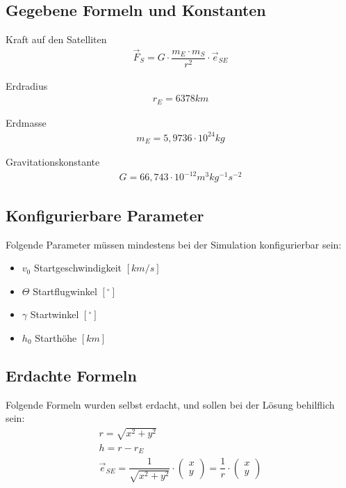 \documentclass[]{scrartcl}
\begin{document}
\subsection{Gegebene Formeln und Konstanten}
Kraft auf den Satelliten
\begin{align}
\vec{F}_{S} = G \cdot \dfrac{m_{E} \cdot m_{S}}{r^2} \cdot \vec{e}_{SE}
\end{align}

Erdradius
\begin{align}
r_{E} = 6378 km
\end{align}

Erdmasse
\begin{align}
m_{E} = 5,9736 \cdot 10^{24} kg
\end{align}

Gravitationskonstante
\begin{align}
G = 66,743 \cdot 10^{-12} m^{3} kg^{-1} s^{-2}
\end{align}

\subsection{Konfigurierbare Parameter}
Folgende Parameter müssen mindestens bei der Simulation konfigurierbar sein:
\begin{itemize}
\item $v_{0}$ Startgeschwindigkeit $[km/s]$
\item $\Theta$ Startflugwinkel $[^\circ]$
\item $\gamma$ Startwinkel $[^\circ]$
\item $h_{0}$ Starthöhe $[km]$
\end{itemize}

\subsection{Erdachte Formeln}
Folgende Formeln wurden selbst erdacht, und sollen bei der Lösung behilflich sein:
\begin{align}
r = \sqrt{x^2 + y^2} \\
h = r - r_{E} \\
\vec{e}_{SE} = \dfrac{1}{\sqrt{x^2 + y^2}}\cdot \begin{pmatrix}x\\y\end{pmatrix} = \dfrac{1}{r} \cdot \begin{pmatrix}x\\y\end{pmatrix}
\end{align}
\end{document}
